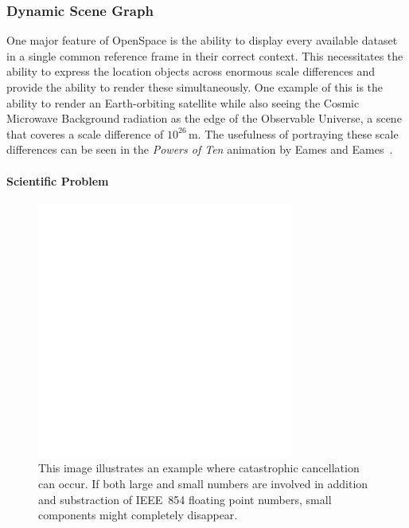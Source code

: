 

\subsubsection{Dynamic Scene Graph} \label{contributions:astro:dsg}
One major feature of OpenSpace is the ability to display every available dataset in a single common reference frame in their correct context.  This necessitates the ability to express the location objects across enormous scale differences and provide the ability to render these simultaneously.  One example of this is the ability to render an Earth-orbiting satellite while also seeing the Cosmic Microwave Background radiation as the edge of the Observable Universe, a scene that coveres a scale difference of $10^26\,$m.  The usefulness of portraying these scale differences can be seen in the \emph{Powers of Ten} animation by Eames and Eames~\cite{morrison1982powers}.

\paragraph{Scientific Problem} \label{contributions:astro:dsg:problem}
\begin{figure}
\centering
\includegraphics[width=0.75\textwidth]{figures/empty.png}
\caption{This image illustrates an example where catastrophic cancellation can occur.  If both large and small numbers are involved in addition and substraction of IEEE~854 floating point numbers, small components might completely disappear.}
\label{contributions:astro:dsg:cc}
\end{figure}

